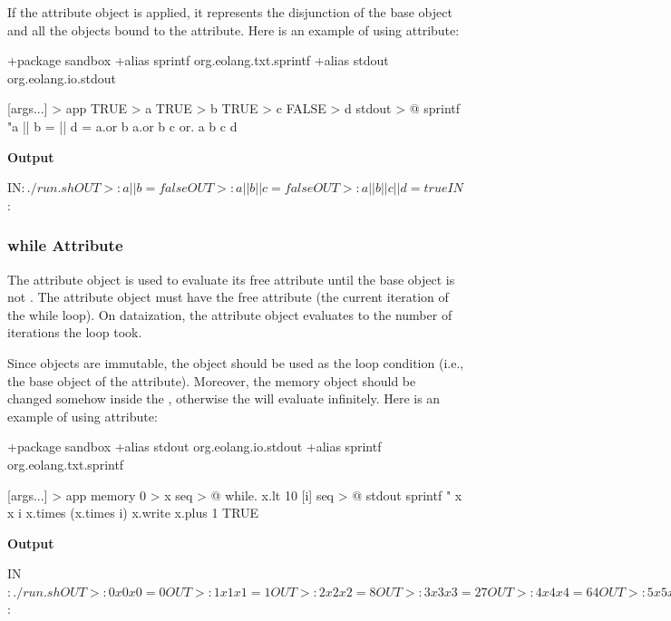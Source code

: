 \documentclass[12pt]{book}
\begin{document}
{If the  attribute object is applied, it represents the disjunction of the base  object and all the objects bound to the  attribute. Here is an example of using  attribute:

\begin{ffcode}
+package sandbox
+alias sprintf org.eolang.txt.sprintf
+alias stdout org.eolang.io.stdout

[args...] > app
  TRUE > a
  TRUE > b
  TRUE > c
  FALSE > d
  stdout > @
    sprintf
      "a || b = %
      || d = %
      a.or b
      a.or b c
      or.
        a
        b
        c
        d
\end{ffcode}
\textbf{Output}
\begin{ffcode}
IN$: ./run.sh
OUT>: a || b = false
OUT>: a || b || c = false
OUT>: a || b || c || d = true
IN$:
\end{ffcode}

\subsubsection{while Attribute}
The  attribute object is used to evaluate its  free attribute until the base  object is not .
The  attribute object must have the free attribute  (the current iteration of the while loop).
On dataization, the  attribute object evaluates to the number of iterations the loop took.

Since objects are immutable, the  object should be used as the loop condition (i.e., the base  object of the  attribute). Moreover, the memory object should be changed somehow inside the , otherwise the  will evaluate infinitely. Here is an example of using  attribute:

\begin{ffcode}
+package sandbox
+alias stdout org.eolang.io.stdout
+alias sprintf org.eolang.txt.sprintf

[args...] > app
  memory 0 > x
  seq > @
    while.
      x.lt 10
      [i]
        seq > @
          stdout
            sprintf "%
              x
              x
              i
              x.times (x.times i)
          x.write
            x.plus 1
    TRUE
\end{ffcode}
\textbf{Output}
\begin{ffcode}
IN$: ./run.sh
OUT>: 0 x 0 x 0 = 0
OUT>: 1 x 1 x 1 = 1
OUT>: 2 x 2 x 2 = 8
OUT>: 3 x 3 x 3 = 27
OUT>: 4 x 4 x 4 = 64
OUT>: 5 x 5 x 5 = 125
OUT>: 6 x 6 x 6 = 216
OUT>: 7 x 7 x 7 = 343
OUT>: 8 x 8 x 8 = 512
OUT>: 9 x 9 x 9 = 729
OUT>: 10 x 10 x 10 = 1000
IN$:
\end{ffcode}

}
\end{document}
